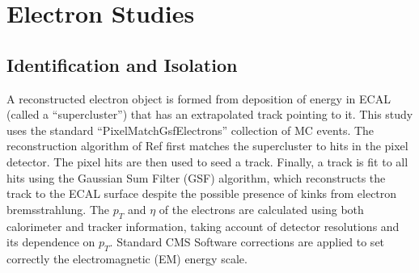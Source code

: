%

\section{Electron Studies} \label{sec:electrons}

\subsection{Identification and Isolation} \label{sec:IdAndIso}

A reconstructed electron object is formed from deposition of energy in ECAL (called a ``supercluster'') that has an 
extrapolated track pointing to it.
This study uses the standard ``PixelMatchGsfElectrons'' collection of MC events\cite{GSFele}.
The reconstruction algorithm of Ref \cite{GSFele} first matches the supercluster to hits in the pixel detector.
The pixel hits are then used to seed a track.  Finally, a track is fit to all hits using the Gaussian Sum Filter 
(GSF) algorithm, which reconstructs the track to the ECAL surface
despite the possible presence of kinks from electron bremsstrahlung.  
The $p_{T}$ and $\eta$ of the electrons are calculated using both calorimeter and tracker information, 
taking account of detector resolutions and its dependence on $p_{T}$.
Standard CMS Software corrections are applied to set correctly the electromagnetic (EM) energy scale.



